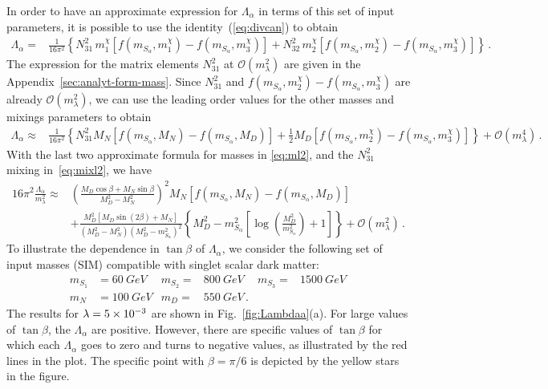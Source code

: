 In order to have an approximate expression for $\Lambda_\alpha$ in terms of this set of input parameters, it is possible to use the identity~(\ref{eq:divcan}) to obtain
\begin{align*}
\Lambda_\alpha=&\frac{1}{16\pi^2}\left\{N_{31}^2\,m^\chi_1\left[ f(m_{S_\alpha},m^\chi_1)-f(m_{S_\alpha},m^\chi_3)\right]
                                +N_{32}^2\,m^\chi_2\left[f(m_{S_\alpha},m^\chi_2)-f(m_{S_\alpha},m^\chi_3)\right]\right\}\,.
\end{align*}
The expression for the matrix elements $N_{31}^2$ at $\mathcal{O}\left( m_{\lambda}^2 \right)$ are given in the Appendix~\ref{sec:analyt-form-mass}. Since $N_{31}^2$ and $f(m_{S_\alpha},m^\chi_2)-f(m_{S_\alpha},m^\chi_3)$ are already $\mathcal{O}\left( m_{\lambda}^2 \right)$, we can use the leading order values for the other masses and mixings parameters to obtain
\begin{align*}
  \Lambda_\alpha\approx&\frac{1}{16\pi^2}\left\{N_{31}^2 M_N\left[ f(m_{S_\alpha},M_N)-f(m_{S_\alpha},M_D)\right]
                                +\frac{1}{2}M_D\left[f(m_{S_\alpha},m^\chi_2)-f(m_{S_\alpha},m^\chi_3)\right]\right\}
+\mathcal{O}\left( m_\lambda^4 \right)\,.
\end{align*}
With the last two approximate formula for masses in \eqref{eq:ml2},  and the $N_{31}^2$  mixing in~\eqref{eq:mixl2}, we have
\begin{align}
\label{eq:lambdaappr}
16\pi^2\frac{\Lambda_\alpha}{m_{\lambda}^{2}}\approx & \left(\frac{M_{D} \cos\beta + M_{N} \sin\beta}{M_{D}^{2} - M_{N}^{2}}\right)^{2}
                                  M_{N}\left[f(m_{S_\alpha},M_N)-f(m_{S_\alpha},M_D)\right]\nonumber\\
&+\frac{ M_{D}^{2}\left[M_{D} \sin\left(2 \beta \right ) + M_{N}\right] 
        }{\left(M_{D}^{2} - M_{N}^{2}\right) \left(M_{D}^{2} - m_{S_\alpha}^{2}\right)^{2}} \left\{M_{D}^{2} - m_{S_\alpha}^{2} \left[\log{\left (\frac{M_{D}^{2}}{m_{S_\alpha}^{2}} \right )} + 1\right]\right\}+\mathcal{O}\left( m_\lambda^2 \right)\,.
\end{align}
%
To illustrate the dependence in $\tan\beta$ of $\Lambda_{\alpha}$, we consider the following set of input masses (SIM) compatible with singlet scalar dark matter:
\begin{align}
\label{eq:bp}
  m_{S_1}&=\SI{60}{GeV} & m_{S_2}=&\SI{800}{GeV} & m_{S_3}=&\SI{1500}{GeV}\, \nonumber\\
  m_N&=\SI{100}{GeV} & m_D=&\SI{550}{GeV}\,.
\end{align}
The results for $\lambda=\num{5E-3}$ are shown in
Fig.~\ref{fig:Lambdaa}(a). For large values of $\tan\beta$, the
$\Lambda_{\alpha}$ are positive. However, there are specific values of $\tan\beta$ for which each $\Lambda_{\alpha}$ 
goes to zero and turns to negative values, as illustrated by the red lines in the plot. 
The specific point with $\beta=\pi/6$ is depicted by the yellow stars in the figure.

